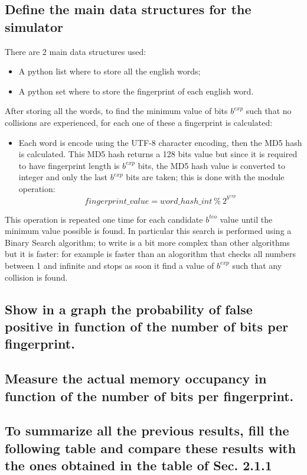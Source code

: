 \documentclass{report}
\begin{document}
			\subsection{Define the main data structures for the simulator}
						There are 2 main data structures used: 
							\begin{itemize}
								\item A python list where to store all the english words;
								\item A python set where to store the fingerprint of each english word.
								\end{itemize}
						After storing all the words, to find the minimum value of bits $b^{exp}$ such that no collisions are experienced, for each one of these a fingerprint is calculated:
						\begin{itemize}
								\item[] Each word is encode using the UTF-8 character encoding, then the MD5 hash is calculated. This MD5 hash returns a 128 bits value but since it is required to have fingerprint length is $b^{exp}$ bits, the MD5 hash value is converted to integer and only the last  $b^{exp}$ bits are taken; this is done with the module operation: \[ fingerprint\_value = word\_hash\_int \: \% \: 2^{b^{exp}} \]
						\end{itemize}
						This operation is repeated one time for each candidate $b^{teo}$ value until the minimum value possible is found. In particular this search is performed using a Binary Search algorithm; to write is a bit more complex than other algorithms but it is faster: for example is faster than an alogorithm that checks all numbers between 1 and infinite and stops as soon it find a value of $b^{exp}$ such that any collision is found.
					
			\subsection{Show in a graph the probability of false positive in function of the number of bits per fingerprint.}
			
			\subsection{Measure the actual memory occupancy in function of the number of bits per fingerprint.}
			
			\subsection{To summarize all the previous results, fill the following table and compare these results with the ones obtained in the table of Sec. 2.1.1}
			
\end{document}
